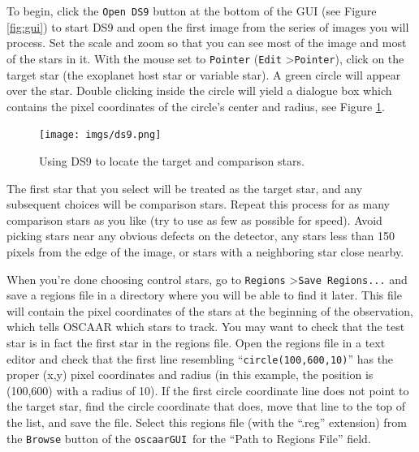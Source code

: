 \documentclass[a4paper]{article}
\newcommand{\code}[1]{\texttt{#1}}
\newcommand{\gui}{\code{oscaarGUI}~}
\begin{document}
To begin, click the \code{Open DS9} button at the bottom of the GUI (see Figure \ref{fig:gui}) to start DS9 and open the first image from the series of images you will process. Set the scale and zoom so that you can see most of the image and most of the stars in it. With the mouse set to \code{Pointer} (\code{Edit} \textgreater  \code{Pointer}), click on the target star (the exoplanet host star or variable star). A green circle will appear over the star. Double clicking inside the circle will yield a dialogue box which contains the pixel coordinates of the circle's center and radius, see Figure \ref{fig:ds9}. 
\begin{figure}[H]
\begin{center}
\texttt{[image: imgs/ds9.png]}
\caption{Using DS9 to locate the target and comparison stars.}
\label{fig:ds9}
\end{center}	
\end{figure}
The first star that you select will be treated as the target star, and any subsequent choices will be comparison stars. Repeat this process for as many comparison stars as you like (try to use as few as possible for speed). Avoid picking stars near any obvious defects on the detector, any stars less than 150 pixels from the edge of the image, or stars with a neighboring star close nearby. 

When you're done choosing control stars, go to \code{Regions} \textgreater  \code{Save Regions...} and save a regions file in a directory where you will be able to find it later. This file will contain the pixel coordinates of the stars at the beginning of the observation, which tells OSCAAR which stars to track. You may want to check that the test star is in fact the first star in the regions file. Open the regions file in a text editor and check that the first line resembling ``\code{circle(100,600,10)}'' has the proper (x,y) pixel coordinates and radius (in this example, the position is (100,600) with a radius of 10). If the first circle coordinate line does not point to the target star, find the circle coordinate that does, move that line to the top of the list, and save the file. Select this regions file (with the ``.reg'' extension) from the \code{Browse} button of the \gui for the ``Path to Regions File'' field.
\end{document}
